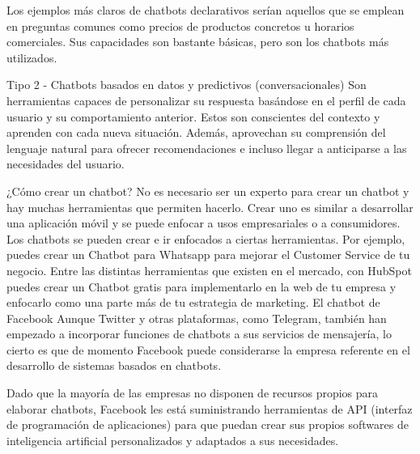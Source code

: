 Los ejemplos más claros de chatbots declarativos serían aquellos que se emplean en preguntas comunes como precios de productos concretos u horarios comerciales. Sus capacidades son bastante básicas, pero son los chatbots más utilizados.

Tipo 2 - Chatbots basados en datos y predictivos (conversacionales)
Son herramientas capaces de personalizar su respuesta basándose en el perfil de cada usuario y su comportamiento anterior. Estos son conscientes del contexto y aprenden con cada nueva situación. Además, aprovechan su comprensión del lenguaje natural para ofrecer recomendaciones e incluso llegar a anticiparse a las necesidades del usuario.



¿Cómo crear un chatbot?
No es necesario ser un experto para crear un chatbot y hay muchas herramientas que permiten hacerlo. Crear uno es similar a desarrollar una aplicación móvil y se puede enfocar a usos empresariales o a consumidores.
Los chatbots se pueden crear e ir enfocados a ciertas herramientas. Por ejemplo, puedes crear un Chatbot para Whatsapp para mejorar el Customer Service de tu negocio.
Entre las distintas herramientas que existen en el mercado, con HubSpot puedes crear un Chatbot gratis para implementarlo en la web de tu empresa y enfocarlo como una parte más de tu estrategia de marketing.
El chatbot de Facebook
Aunque Twitter y otras plataformas, como Telegram, también han empezado a incorporar funciones de chatbots a sus servicios de mensajería, lo cierto es que de momento Facebook puede considerarse la empresa referente en el desarrollo de sistemas basados en chatbots.

Dado que la mayoría de las empresas no disponen de recursos propios para elaborar chatbots, Facebook les está suministrando herramientas de API (interfaz de programación de aplicaciones) para que puedan crear sus propios softwares de inteligencia artificial personalizados y adaptados a sus necesidades.

